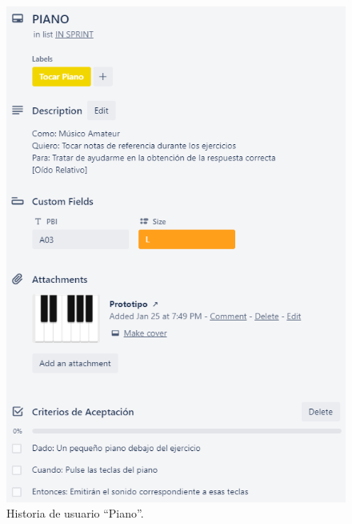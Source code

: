 \documentclass[12pt,twoside,titlepage]{report}
\begin{document}
{\begin{figure}[H]
    \centering
    \includegraphics[scale=1.3]{Scrum/User Stories/Piano}
    \caption{Historia de usuario ``Piano''.}
    \label{fig:Piano}
\end{figure}

}
\end{document}
